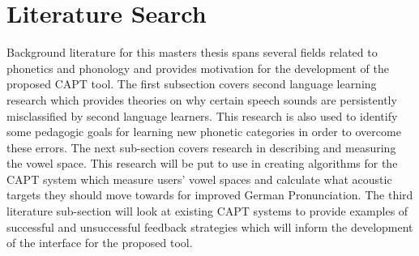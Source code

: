  
\section{Literature Search}
Background literature for this masters thesis spans several fields related to phonetics and phonology and provides motivation for the development of the proposed CAPT tool. The first subsection covers second language learning research which provides theories on why certain speech sounds are persistently misclassified by second language learners. This research is also used to identify some pedagogic goals for learning new phonetic categories in order to overcome these errors.  The next sub-section covers research in describing and measuring the vowel space.  This research will be put to use in creating algorithms for the CAPT system which measure users' vowel spaces and calculate what acoustic targets they should move towards for improved German Pronunciation.   The third literature sub-section will look at existing CAPT systems to provide examples of successful and unsuccessful feedback strategies which will inform the development of the interface for the proposed tool.



